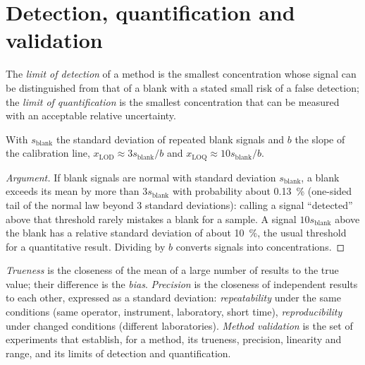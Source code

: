 \section{Detection, quantification and validation}

\begin{definition}[Limits]\label{def:b2:measurement-statistics:limits}
The \emph{limit of detection} of a method is the smallest concentration whose
signal can be distinguished from that of a blank with a stated small risk of a false detection; the
\emph{limit of quantification} is the smallest concentration that can
be measured with an acceptable relative uncertainty.
\end{definition}

\begin{proposition}\label{prop:b2:measurement-statistics:lod}
With $s_{\mathrm{blank}}$ the standard deviation of repeated blank signals and $b$ the slope of the
calibration line, $x_{\mathrm{LOD}} \approx 3s_{\mathrm{blank}}/b$ and $x_{\mathrm{LOQ}} \approx
10s_{\mathrm{blank}}/b$.
\end{proposition}

\begin{proof}[Argument]
If blank signals are normal with standard deviation $s_{\mathrm{blank}}$, a blank exceeds its mean by
more than $3s_{\mathrm{blank}}$ with probability about 0.13~\% (one-sided tail of the normal law beyond
3 standard deviations): calling a signal ``detected'' above that threshold rarely mistakes a blank for
a sample. A signal $10s_{\mathrm{blank}}$ above the blank has a relative standard deviation of about
10~\%, the usual threshold for a quantitative result. Dividing by $b$ converts signals into
concentrations.
\end{proof}

\begin{definition}[Validation]\label{def:b2:measurement-statistics:validation}
\emph{Trueness} is the closeness of the mean of a large number of results to the true
value; their difference is the \emph{bias}. \emph{Precision} is the
closeness of independent results to each other, expressed as a standard deviation:
\emph{repeatability} under the same conditions (same operator, instrument,
laboratory, short time), \emph{reproducibility} under changed conditions
(different laboratories). \emph{Method validation} is the set of experiments
that establish, for a method, its trueness, precision, linearity and range, and its limits of detection
and quantification.
\end{definition}

